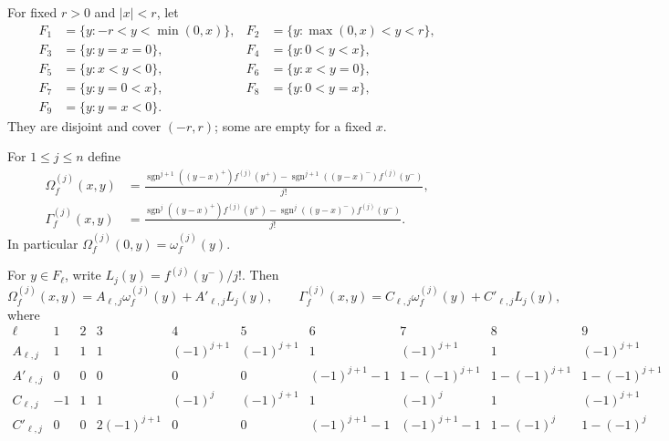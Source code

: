 \begin{definition}
\leanok
For fixed $r>0$ and $|x|<r$, let
\begin{align*}
F_1&=\{y:-r<y<\min(0,x)\},&
F_2&=\{y:\max(0,x)<y<r\},\\
F_3&=\{y:y=x=0\},&
F_4&=\{y:0<y<x\},\\
F_5&=\{y:x<y<0\},&
F_6&=\{y:x<y=0\},\\
F_7&=\{y:y=0<x\},&
F_8&=\{y:0<y=x\},\\
F_9&=\{y:y=x<0\}.&&
\end{align*}
They are disjoint and cover $(-r,r)$; some are empty for a fixed $x$.
\end{definition}

\begin{definition}
\leanok
{}
For $1\leq j\leq n$ define
\begin{align*}
\Omega_f^{(j)}(x,y)
 &=\frac{\operatorname{sgn}^{j+1}((y-x)^+)f^{(j)}(y^+)
 -\operatorname{sgn}^{j+1}((y-x)^-)f^{(j)}(y^-)}{j!},\\
\Gamma_f^{(j)}(x,y)
 &=\frac{\operatorname{sgn}^{j}((y-x)^+)f^{(j)}(y^+)
 -\operatorname{sgn}^{j}((y-x)^-)f^{(j)}(y^-)}{j!}.
\end{align*}
In particular $\Omega_f^{(j)}(0,y)=\omega_f^{(j)}(y)$.
\end{definition}

\begin{lemma}
\leanok
{}
For $y\in F_\ell$, write $L_j(y)=f^{(j)}(y^-)/j!$.  Then
\[
\Omega_f^{(j)}(x,y)=A_{\ell,j}\omega_f^{(j)}(y)
                    +A'_{\ell,j}L_j(y),\qquad
\Gamma_f^{(j)}(x,y)=C_{\ell,j}\omega_f^{(j)}(y)
                    +C'_{\ell,j}L_j(y),
\]
where
\scriptsize
\[
\begin{array}{c|ccccccccc}
\ell&1&2&3&4&5&6&7&8&9\\ \hline
A_{\ell,j}&1&1&1&(-1)^{j+1}&(-1)^{j+1}&1&(-1)^{j+1}&1&(-1)^{j+1}\\
A'_{\ell,j}&0&0&0&0&0&(-1)^{j+1}-1&1-(-1)^{j+1}&1-(-1)^{j+1}&1-(-1)^{j+1}\\
C_{\ell,j}&-1&1&1&(-1)^j&(-1)^{j+1}&1&(-1)^j&1&(-1)^{j+1}\\
C'_{\ell,j}&0&0&2(-1)^{j+1}&0&0&(-1)^{j+1}-1&(-1)^{j+1}-1&1-(-1)^j&1-(-1)^j
\end{array}
\]
\normalsize
\end{lemma}

